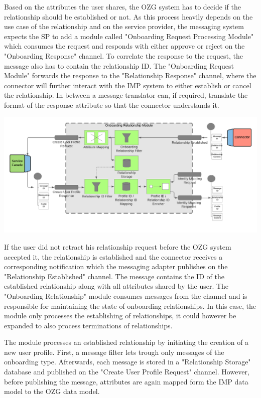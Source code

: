 Based on the attributes the user shares, the OZG system has to decide if the relationship should be established or not. As this process heavily depends on the use case of the relationship and on the service provider, the messaging system expects the SP to add a module called "Onboarding Request Processing Module" which consumes the request and responds with either approve or reject on the "Onboarding Response" channel. To correlate the response to the request, the message also has to contain the relationship ID. The "Onboarding Request Module" forwards the response to the "Relationship Response" channel, where the connector will further interact with the IMP system to either establish or cancel the relationship. In between a message translator can, if required, translate the format of the response attribute so that the connector understands it.

\begin{center}
    \includegraphics[scale=0.6]{Diagrams/Integration Architecture 1/Technological Integration/8. Onboarding Relationship Module.pdf}
\end{center}

If the user did not retract his relationship request before the OZG system accepted it, the relationship is established and the connector receives a corresponding notification which the messaging adapter publishes on the "Relationship Established" channel. The message contains the ID of the established relationship along with all attributes shared by the user. The "Onboarding Relationship" module consumes messages from the channel and is responsible for maintaining the state of onboarding relationships. In this case, the module only processes the establishing of relationships, it could however be expanded to also process terminations of relationships.

The module processes an established relationship by initiating the creation of a new user profile. First, a message filter lets trough only messages of the onboarding type. Afterwards, each message is stored in a "Relationship Storage" database and published on the "Create User Profile Request" channel. However, before publishing the message, attributes are again mapped form the IMP data model to the OZG data model.

